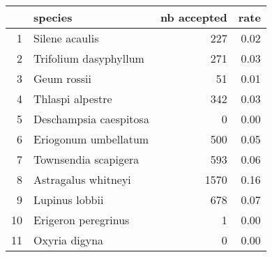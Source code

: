 \begin{table}[ht]
\centering
\begin{tabular}{rlrr}
  \hline
 & species & nb accepted & rate \\ 
  \hline
1 & Silene acaulis & 227 & 0.02 \\ 
  2 & Trifolium dasyphyllum & 271 & 0.03 \\ 
  3 & Geum rossii & 51 & 0.01 \\ 
  4 & Thlaspi alpestre & 342 & 0.03 \\ 
  5 & Deschampsia caespitosa & 0 & 0.00 \\ 
  6 & Eriogonum umbellatum & 500 & 0.05 \\ 
  7 & Townsendia scapigera & 593 & 0.06 \\ 
  8 & Astragalus whitneyi & 1570 & 0.16 \\ 
  9 & Lupinus lobbii & 678 & 0.07 \\ 
  10 & Erigeron peregrinus & 1 & 0.00 \\ 
  11 & Oxyria digyna & 0 & 0.00 \\ 
   \hline
\end{tabular}
\end{table}
